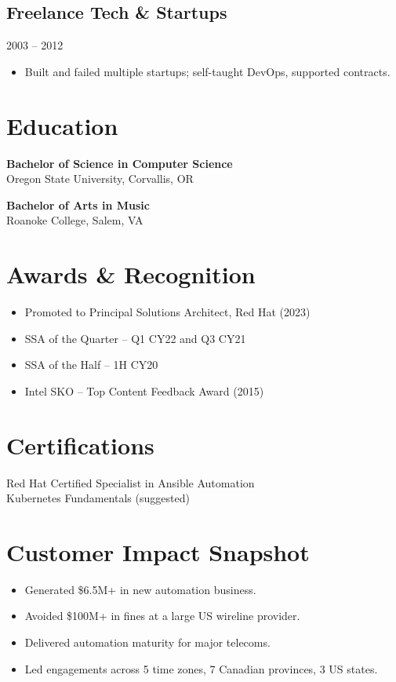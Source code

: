 \documentclass[11pt]{article}
\begin{document}
\subsection{Freelance Tech \& Startups}
\hfill 2003 -- 2012
\begin{itemize}[leftmargin=*]
    \item Built and failed multiple startups; self-taught DevOps, supported contracts.
\end{itemize}

\section*{Education}
\textbf{Bachelor of Science in Computer Science} \\
Oregon State University, Corvallis, OR

\textbf{Bachelor of Arts in Music} \\
Roanoke College, Salem, VA

\section*{Awards \& Recognition}
\begin{itemize}[leftmargin=*]
    \item Promoted to Principal Solutions Architect, Red Hat (2023)
    \item SSA of the Quarter -- Q1 CY22 and Q3 CY21
    \item SSA of the Half -- 1H CY20
    \item Intel SKO -- Top Content Feedback Award (2015)
\end{itemize}

\section*{Certifications}
Red Hat Certified Specialist in Ansible Automation \\
Kubernetes Fundamentals (suggested) \\
[List others if held, e.g., AWS, CKA]

\section*{Customer Impact Snapshot}
\begin{itemize}[leftmargin=*]
    \item Generated \$6.5M+ in new automation business.
    \item Avoided \$100M+ in fines at a large US wireline provider.
    \item Delivered automation maturity for major telecoms.
    \item Led engagements across 5 time zones, 7 Canadian provinces, 3 US states.
\end{itemize}
\end{document}
